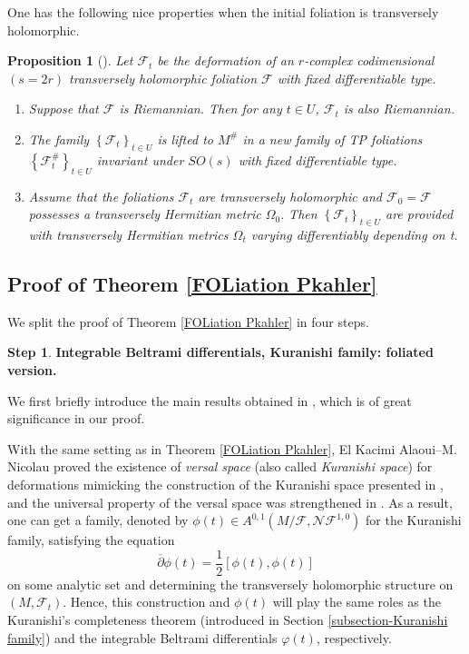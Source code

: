 \documentclass[12pt]{amsart}
\numberwithin{equation}{section}
\newtheorem{proposition}[theorem]{Proposition}
\theoremstyle{definition}
\newtheorem{step}{Step}
\theoremstyle{definition}
\theoremstyle{definition}
\renewcommand{\1}{\mathsf{1}}
\renewcommand{\>}{\rightarrow}
\newcommand{\bp}{\overline\partial}
\def\mc{\mathcal}
\def\v{\varphi}
\theoremstyle{plain} %
\theoremstyle{plain} %
\theoremstyle{plain} %
\begin{document}
	One has the following nice properties when the initial foliation is transversely holomorphic.
	\begin{proposition}[{\cite[Proposition 4.3]{EKAG97}}]
		Let $\mathcal F_t$ be the deformation of an  $r$-complex codimensional $(s=2r)$ transversely holomorphic foliation $\mathcal F$ with fixed differentiable type.
		\begin{enumerate}[$(i)$]
			\item Suppose that $\mc F$ is Riemannian. Then for any $t\in U$, $\mc F_t$ is also Riemannian.
			\item The family $\left\{\mc F_t\right\}_{t\in U}$ is  lifted to $M^\#$ in a  new family of TP foliations $\left\{\mc F_t^\#\right\}_{t\in U}$ invariant under $SO(s)$ with fixed differentiable type.
			\item Assume that the foliations $\mc F_t$ are transversely holomorphic and $\mc F_0=\mc F$ possesses a transversely Hermitian metric $\Omega_{0}.$ Then $\left\{\mc F_t\right\}_{t\in U}$  are provided with transversely Hermitian metrics $\Omega_t$ varying	differentiably depending on t.
		\end{enumerate}
	\end{proposition}
	\subsection{Proof of Theorem \ref{FOLiation Pkahler}}\label{Foliation proofproof}
	We split the proof of  Theorem \ref{FOLiation Pkahler} in four steps.
	\setcounter{step}{0}
	\begin{step}\label{foliation step 1}
		{\rm\textbf{Integrable Beltrami differentials, Kuranishi family: foliated version.}}\end{step}
	
	We first briefly introduce the main results obtained in \cite{EKAN89}, which is of great significance in our proof.
	
	With the same setting as in  Theorem \ref{FOLiation Pkahler}, El Kacimi Alaoui--M. Nicolau proved the existence of \emph{versal space} (also called \emph{Kuranishi space}) for deformations mimicking the construction of the Kuranishi space presented in \cite{Ku64}, and the universal property of the versal space was strengthened in \cite{Gb92}. As a result, one can get a family, denoted by $\phi(t)\in A^{0,1}(M/\mc F,\mc N\mc F^{1,0})$ for the Kuranishi family, satisfying the equation
	$$
	\bp\phi(t)=\frac{1}{2}\left[\phi(t),\phi(t)\right]
	$$
	on some analytic set and determining the transversely holomorphic structure on $(M,\mc F_t)$.
	Hence, this construction and $\phi(t)$ will play the same roles as the Kuranishi's completeness theorem (introduced in Section \ref{subsection-Kuranishi family})  and the  integrable Beltrami differentials $\v(t)$, respectively.  
    
\end{document}
